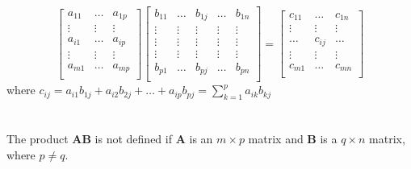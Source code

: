 \documentclass[../setup.tex]{subfiles}
\begin{document}
\[
\begin{bmatrix}
a_{11} & \dots & a_{1p} \\
\vdots & \vdots & \vdots \\
a_{i1} & \dots & a_{ip} \\
\vdots & \vdots & \vdots \\
a_{m1} & \dots & a_{mp} \\
\end{bmatrix}
\begin{bmatrix}
b_{11} & \dots & b_{1j} & \dots & b_{1n} \\
\vdots & \vdots & \vdots & \vdots & \vdots \\
\vdots & \vdots & \vdots & \vdots & \vdots \\
\vdots & \vdots & \vdots & \vdots & \vdots \\
b_{p1} & \dots & b_{pj} & \dots & b_{pn} \\
\end{bmatrix} =
\begin{bmatrix}
c_{11} & \dots & c_{1n} \\
\vdots & \vdots & \vdots \\
\dots & c_{ij} & \dots \\
\vdots & \vdots & \vdots \\
c_{m1} & \dots & c_{mn} \\
\end{bmatrix}
\]
where $c_{ij} = a_{i1}b_{1j} + a_{i2}b_{2j} + \dots + a_{ip}b_{pj} = \sum\limits_{k = 1}^pa_{ik}b_{kj}$ \\
\phantom \\ \\
The product $\bm{AB}$ is not defined if $\bm{A}$ is an $m \times p$ matrix and $\bm{B}$  is a $q \times n$ matrix, where $p \neq q$. 
\end{document}
